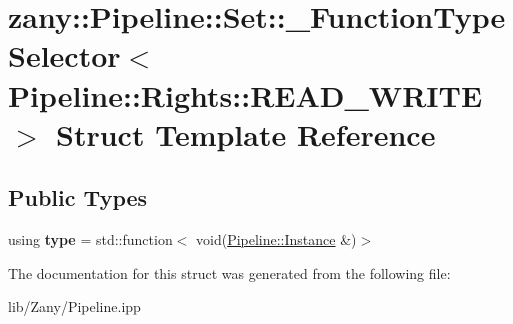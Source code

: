 \hypertarget{structzany_1_1_pipeline_1_1_set_1_1___function_type_selector_3_01_pipeline_1_1_rights_1_1_r_e_a_d___w_r_i_t_e_01_4}{}\section{zany\+:\+:Pipeline\+:\+:Set\+:\+:\+\_\+\+Function\+Type\+Selector$<$ Pipeline\+:\+:Rights\+:\+:R\+E\+A\+D\+\_\+\+W\+R\+I\+TE $>$ Struct Template Reference}
\label{structzany_1_1_pipeline_1_1_set_1_1___function_type_selector_3_01_pipeline_1_1_rights_1_1_r_e_a_d___w_r_i_t_e_01_4}
\subsection*{Public Types}
\begin{DoxyCompactItemize}
\item 
\mbox{\label{structzany_1_1_pipeline_1_1_set_1_1___function_type_selector_3_01_pipeline_1_1_rights_1_1_r_e_a_d___w_r_i_t_e_01_4_abc8dda3d51c885cfe90ec3caffbb08a6}} 
using {\bfseries type} = std\+::function$<$ void(\hyperlink{classzany_1_1_pipeline_1_1_instance}{Pipeline\+::\+Instance} \&)$>$
\end{DoxyCompactItemize}


The documentation for this struct was generated from the following file\+:\begin{DoxyCompactItemize}
\item 
lib/\+Zany/Pipeline.\+ipp\end{DoxyCompactItemize}
